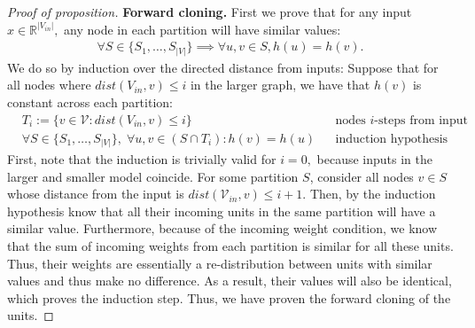 \documentclass[11pt]{article}
\newcommand{\R}{\mathbb{R}}
\begin{document}
\begin{proof}[Proof of proposition]

    \textbf{Forward cloning.} First we prove that for any input $x \in \R^{|V_{in}|},$ any node in each partition will have similar values:
    \begin{align*}
        \forall S \in \{S_1,\dots,S_{|V|}\} \implies \forall u,v \in S, h(u) = h(v). 
    \end{align*}
    We do so by induction over the directed distance from inputs:
    Suppose that for all nodes where $dist(V_{in},v) \le i$ in the larger graph, we have that $h(v)$ is constant across each partition: 
    \begin{align*}
        &T_i:= \{v\in \mathcal{V}: dist(V_{in},v) \le i\} && \text{nodes $i$-steps from input}\\
        &\forall S \in \{S_1,\dots,S_{|V|}\}, \; \forall u,v \in (S\cap T_i): h(v) = h(u)  && \text{induction hypothesis}
    \end{align*}
    First, note that the induction is trivially valid for $i=0,$ because inputs in the larger and smaller model coincide. 
    For some partition $S$, consider all nodes $v \in S$ whose distance from the input is $dist(\mathcal{V}_{in},v) \le i+1.$ Then, by the induction hypothesis know that all their incoming units in the same partition will have a similar value. Furthermore, because of the incoming weight condition, we know that the sum of incoming weights from each partition is similar for all these units. Thus, their weights are essentially a re-distribution between units with similar values and thus make no difference. As a result, their values will also be identical, which proves the induction step. Thus, we have proven the forward cloning of the units. 
    

\end{proof}
\end{document}
